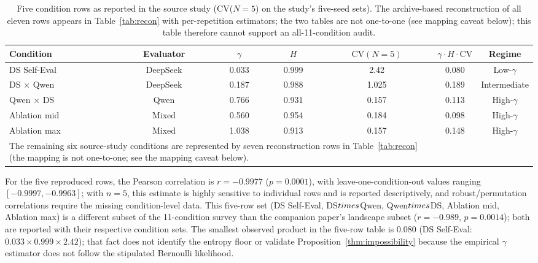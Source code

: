 \documentclass[11pt]{article}
\begin{document}
\begin{table}[t]
\centering
\caption{Five condition rows as reported in the source study (CV($N{=}5$) on the study's five-seed sets). The archive-based reconstruction of all eleven rows appears in Table~\ref{tab:recon} with per-repetition estimators; the two tables are not one-to-one (see mapping caveat below); this table therefore cannot support an all-11-condition audit.}
\label{tab:triangle-11}
\footnotesize
\begin{tabular}{@{}lcccccc@{}}
\toprule
Condition & Evaluator & $\gamma$ & $H$ & $\mathrm{CV}(N{=}5)$ & $\gamma \cdot H \cdot \mathrm{CV}$ & Regime \\
\midrule
DS Self-Eval & DeepSeek & 0.033 & 0.999 & 2.42 & 0.080 & Low-$\gamma$ \\
DS $\times$ Qwen & DeepSeek & 0.187 & 0.988 & 1.025 & 0.189 & Intermediate \\
Qwen $\times$ DS & Qwen & 0.766 & 0.931 & 0.157 & 0.113 & High-$\gamma$ \\
Ablation mid & Mixed & 0.560 & 0.954 & 0.184 & 0.098 & High-$\gamma$ \\
Ablation max & Mixed & 1.038 & 0.913 & 0.157 & 0.148 & High-$\gamma$ \\
\midrule
\multicolumn{5}{l}{\footnotesize The remaining six source-study conditions are represented by seven reconstruction rows in Table~\ref{tab:recon} (the mapping is not one-to-one; see the mapping caveat below).} \\
\bottomrule
\end{tabular}
\end{table}

For the five reproduced rows, the Pearson correlation is $r=-0.9977$ ($p = 0.0001$), with leave-one-condition-out values ranging $[-0.9997, -0.9963]$; with $n=5$, this estimate is highly sensitive to individual rows and is reported descriptively, and robust/permutation correlations require the missing condition-level data. This five-row set (DS Self-Eval, DS$\\times$Qwen, Qwen$\\times$DS, Ablation mid, Ablation max) is a different subset of the 11-condition survey than the companion paper's landscape subset ($r=-0.989$, $p=0.0014$); both are reported with their respective condition sets. The smallest observed product in the five-row table is $0.080$ (DS Self-Eval: $0.033 \times 0.999 \times 2.42$); that fact does not identify the entropy floor or validate Proposition~\ref{thm:impossibility} because the empirical $\gamma$ estimator does not follow the stipulated Bernoulli likelihood.
\end{document}
